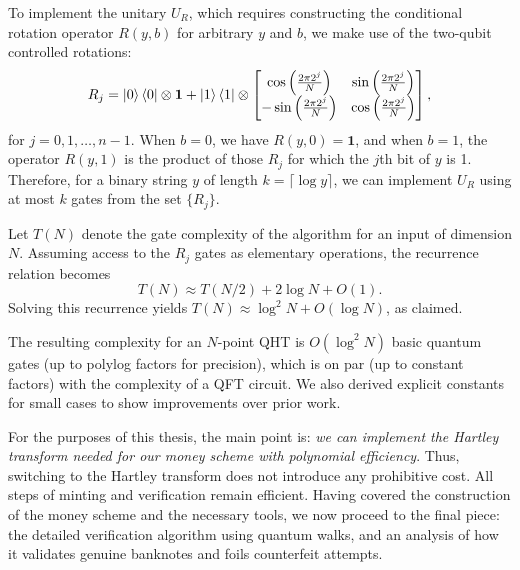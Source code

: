 \documentclass[12pt]{report}
\begin{document}
    To implement the unitary \( U_R \), which requires constructing the conditional rotation operator \( R(y, b) \) for arbitrary \( y \) and \( b \), we make use of the two-qubit controlled rotations:
    \[
    R_j = \ket{0}\bra{0} \otimes \mathbf{1} + \ket{1}\bra{1} \otimes
    \begin{bmatrix}
    \cos\left(\frac{2\pi 2^j}{N}\right) & \sin\left(\frac{2\pi 2^j}{N}\right) \\
    -\sin\left(\frac{2\pi 2^j}{N}\right) & \cos\left(\frac{2\pi 2^j}{N}\right)
    \end{bmatrix},
    \]
    for \( j = 0, 1, \dots, n - 1 \). When \( b = 0 \), we have \( R(y, 0) = \mathbf{1} \), and when \( b = 1 \), the operator \( R(y, 1) \) is the product of those \( R_j \) for which the \( j \)th bit of \( y \) is 1. Therefore, for a binary string \( y \) of length \( k = \lceil \log y \rceil \), we can implement \( U_R \) using at most \( k \) gates from the set \( \{R_j\} \).
    
    Let \( T(N) \) denote the gate complexity of the algorithm for an input of dimension \( N \). Assuming access to the \( R_j \) gates as elementary operations, the recurrence relation becomes
    \[
    T(N) \approx T(N / 2) + 2\log N + O(1).
    \]
    Solving this recurrence yields \( T(N) \approx \log^2 N + O(\log N) \), as claimed.


The resulting complexity for an $N$-point QHT is $O(\log^2 N)$ basic quantum gates (up to polylog factors for precision), which is on par (up to constant factors) with the complexity of a QFT circuit. We also derived explicit constants for small cases to show improvements over prior work.

For the purposes of this thesis, the main point is: \emph{we can implement the Hartley transform needed for our money scheme with polynomial efficiency}. Thus, switching to the Hartley transform does not introduce any prohibitive cost. All steps of minting and verification remain efficient. Having covered the construction of the money scheme and the necessary tools, we now proceed to the final piece: the detailed verification algorithm using quantum walks, and an analysis of how it validates genuine banknotes and foils counterfeit attempts.
\vspace{1em}
\end{document}
